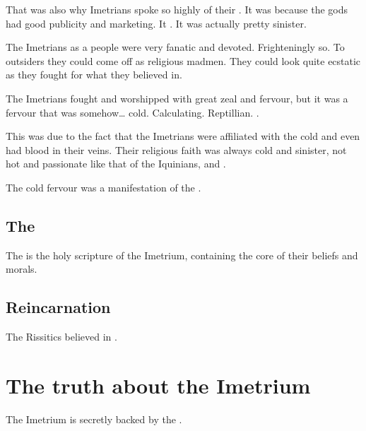 That was also why Imetrians spoke so highly of their . 
It was because the gods had good publicity and marketing. 
It . 
It was actually pretty sinister.

The Imetrians as a people were very fanatic and devoted. 
Frighteningly so. 
To outsiders they could come off as religious madmen. 
They could look quite ecstatic as they fought for what they believed in. 

The Imetrians fought and worshipped with great zeal and fervour, but it was a fervour that was somehow\ldots{} cold. 
Calculating. 
Reptillian. 
\Ophidian. 

This was due to the fact that the Imetrians were affiliated with the cold \nagae{} and even had \naga{} blood in their veins. 
Their religious faith was always cold and sinister, not hot and passionate like that of the Iquinians, \Ortaicans{} and \Tepharites. 

The cold fervour was a manifestation of the . 







\subsection{The \Imetriad}
\index{\Imetriad}
The \Imetriad{} is the holy scripture of the Imetrium, containing the core of their beliefs and morals. 









\subsection{Reincarnation}
The Rissitics believed in . 















\section{The truth about the Imetrium}
The Imetrium is secretly backed by the \nagae. 

